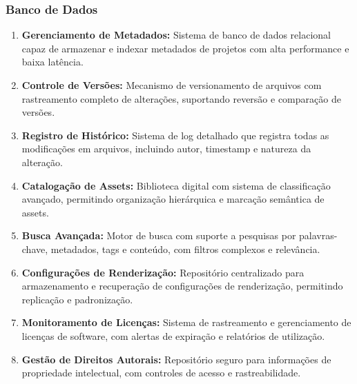 \subsubsection{Banco de Dados}
\begin{enumerate}[leftmargin=*]
    \item \textbf{Gerenciamento de Metadados:} Sistema de banco de dados relacional capaz de armazenar e indexar metadados de projetos com alta performance e baixa latência.
    \item \textbf{Controle de Versões:} Mecanismo de versionamento de arquivos com rastreamento completo de alterações, suportando reversão e comparação de versões.
    \item \textbf{Registro de Histórico:} Sistema de log detalhado que registra todas as modificações em arquivos, incluindo autor, timestamp e natureza da alteração.
    \item \textbf{Catalogação de Assets:} Biblioteca digital com sistema de classificação avançado, permitindo organização hierárquica e marcação semântica de assets.
    \item \textbf{Busca Avançada:} Motor de busca com suporte a pesquisas por palavras-chave, metadados, tags e conteúdo, com filtros complexos e relevância.
    \item \textbf{Configurações de Renderização:} Repositório centralizado para armazenamento e recuperação de configurações de renderização, permitindo replicação e padronização.
    \item \textbf{Monitoramento de Licenças:} Sistema de rastreamento e gerenciamento de licenças de software, com alertas de expiração e relatórios de utilização.
    \item \textbf{Gestão de Direitos Autorais:} Repositório seguro para informações de propriedade intelectual, com controles de acesso e rastreabilidade.
\end{enumerate}

